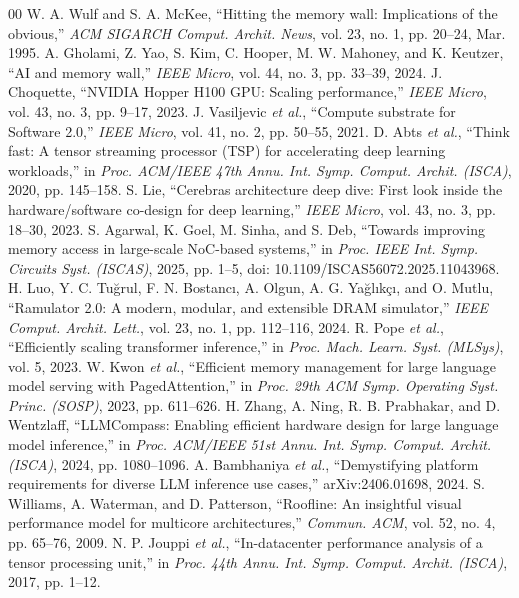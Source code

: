 \documentclass[conference]{IEEEtran}
\begin{document}
\begin{thebibliography}{00}
 W. A. Wulf and S. A. McKee, ``Hitting the memory wall: Implications of the obvious,'' \emph{ACM SIGARCH Comput. Archit. News}, vol. 23, no. 1, pp. 20--24, Mar. 1995.
 A. Gholami, Z. Yao, S. Kim, C. Hooper, M. W. Mahoney, and K. Keutzer, ``AI and memory wall,'' \emph{IEEE Micro}, vol. 44, no. 3, pp. 33--39, 2024.
 J. Choquette, ``NVIDIA Hopper H100 GPU: Scaling performance,'' \emph{IEEE Micro}, vol. 43, no. 3, pp. 9--17, 2023.
 J. Vasiljevic \emph{et al.}, ``Compute substrate for Software 2.0,'' \emph{IEEE Micro}, vol. 41, no. 2, pp. 50--55, 2021.
 D. Abts \emph{et al.}, ``Think fast: A tensor streaming processor (TSP) for accelerating deep learning workloads,'' in \emph{Proc. ACM/IEEE 47th Annu. Int. Symp. Comput. Archit. (ISCA)}, 2020, pp. 145--158.
 S. Lie, ``Cerebras architecture deep dive: First look inside the hardware/software co-design for deep learning,'' \emph{IEEE Micro}, vol. 43, no. 3, pp. 18--30, 2023.
 S. Agarwal, K. Goel, M. Sinha, and S. Deb, ``Towards improving memory access in large-scale NoC-based systems,'' in \emph{Proc. IEEE Int. Symp. Circuits Syst. (ISCAS)}, 2025, pp. 1--5, doi: 10.1109/ISCAS56072.2025.11043968.
 H. Luo, Y. C. Tu\u{g}rul, F. N. Bostanc{\i}, A. Olgun, A. G. Ya\u{g}l{\i}k\c{c}{\i}, and O. Mutlu, ``Ramulator 2.0: A modern, modular, and extensible DRAM simulator,'' \emph{IEEE Comput. Archit. Lett.}, vol. 23, no. 1, pp. 112--116, 2024.
 R. Pope \emph{et al.}, ``Efficiently scaling transformer inference,'' in \emph{Proc. Mach. Learn. Syst. (MLSys)}, vol. 5, 2023.
 W. Kwon \emph{et al.}, ``Efficient memory management for large language model serving with PagedAttention,'' in \emph{Proc. 29th ACM Symp. Operating Syst. Princ. (SOSP)}, 2023, pp. 611--626.
 H. Zhang, A. Ning, R. B. Prabhakar, and D. Wentzlaff, ``LLMCompass: Enabling efficient hardware design for large language model inference,'' in \emph{Proc. ACM/IEEE 51st Annu. Int. Symp. Comput. Archit. (ISCA)}, 2024, pp. 1080--1096.
 A. Bambhaniya \emph{et al.}, ``Demystifying platform requirements for diverse LLM inference use cases,'' arXiv:2406.01698, 2024.
 S. Williams, A. Waterman, and D. Patterson, ``Roofline: An insightful visual performance model for multicore architectures,'' \emph{Commun. ACM}, vol. 52, no. 4, pp. 65--76, 2009.
 N. P. Jouppi \emph{et al.}, ``In-datacenter performance analysis of a tensor processing unit,'' in \emph{Proc. 44th Annu. Int. Symp. Comput. Archit. (ISCA)}, 2017, pp. 1--12.

\end{thebibliography}
\end{document}
